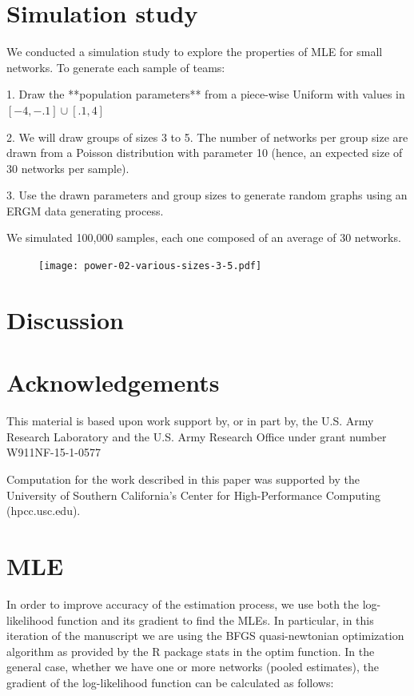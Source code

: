 \documentclass[12pt]{article}
\begin{document}
\section{Simulation study}

We conducted a simulation study to explore the properties of MLE for small networks. To generate each sample of teams:

1. Draw the **population parameters** from a piece-wise Uniform with values in $[-4, -.1]\cup[.1, 4]$

2. We will draw groups of sizes 3 to 5. The number of networks per group size are drawn from a Poisson distribution with parameter 10 (hence, an expected size of 30 networks per sample).

3. Use the drawn parameters and group sizes to generate random graphs using an ERGM data generating process.

We simulated 100,000 samples, each one composed of an average of 30 networks.

\begin{figure}
	\centering
	\texttt{[image: power-02-various-sizes-3-5.pdf]}
\end{figure}

\section{Discussion}

\section{Acknowledgements}

This material is based upon work support by, or in part by, the U.S. Army Research Laboratory and the U.S. Army Research Office under grant number W911NF-15-1-0577

Computation for the work described in this paper was supported by the University of Southern California’s Center for High-Performance Computing (hpcc.usc.edu).

\clearpage




\clearpage

\appendix

\section{MLE}

In order to improve accuracy of the estimation process, we use both the log-likelihood function and its gradient to find the MLEs. In particular, in this iteration of the manuscript we are using the BFGS quasi-newtonian optimization algorithm as provided by the R package stats in the optim function. In the general case, whether we have one or more networks (pooled estimates), the gradient of the log-likelihood function can be calculated as follows:
\end{document}
